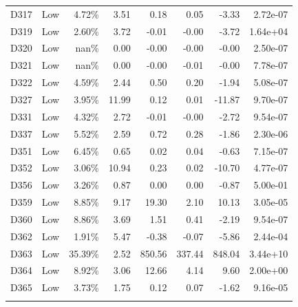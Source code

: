 \begin{tabular}{l l r r r r r r}
D317 & Low & 4.72\% & 3.51 & 0.18 & 0.05 & -3.33 & 2.72e-07 \\
D319 & Low & 2.60\% & 3.72 & -0.01 & -0.00 & -3.72 & 1.64e+04 \\
D320 & Low & nan\% & 0.00 & -0.00 & -0.00 & -0.00 & 2.50e-07 \\
D321 & Low & nan\% & 0.00 & -0.00 & -0.01 & -0.00 & 7.78e-07 \\
D322 & Low & 4.59\% & 2.44 & 0.50 & 0.20 & -1.94 & 5.08e-07 \\
D327 & Low & 3.95\% & 11.99 & 0.12 & 0.01 & -11.87 & 9.70e-07 \\
D331 & Low & 4.32\% & 2.72 & -0.01 & -0.00 & -2.72 & 9.54e-07 \\
D337 & Low & 5.52\% & 2.59 & 0.72 & 0.28 & -1.86 & 2.30e-06 \\
D351 & Low & 6.45\% & 0.65 & 0.02 & 0.04 & -0.63 & 7.15e-07 \\
D352 & Low & 3.06\% & 10.94 & 0.23 & 0.02 & -10.70 & 4.77e-07 \\
D356 & Low & 3.26\% & 0.87 & 0.00 & 0.00 & -0.87 & 5.00e-01 \\
D359 & Low & 8.85\% & 9.17 & 19.30 & 2.10 & 10.13 & 3.05e-05 \\
D360 & Low & 8.86\% & 3.69 & 1.51 & 0.41 & -2.19 & 9.54e-07 \\
D362 & Low & 1.91\% & 5.47 & -0.38 & -0.07 & -5.86 & 2.44e-04 \\
D363 & Low & 35.39\% & 2.52 & 850.56 & 337.44 & 848.04 & 3.44e+10 \\
D364 & Low & 8.92\% & 3.06 & 12.66 & 4.14 & 9.60 & 2.00e+00 \\
D365 & Low & 3.73\% & 1.75 & 0.12 & 0.07 & -1.62 & 9.16e-05 \\
\noalign{\smallskip}\hline
\end{tabular}